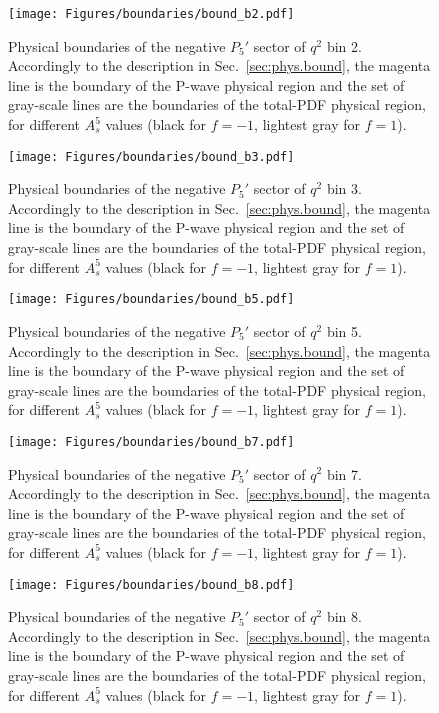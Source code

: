 \begin{figure}[!hbt]
  \centering
  \texttt{[image: Figures/boundaries/bound\_b2.pdf]}
  \caption{Physical boundaries of the negative $P_5'$ sector of $q^2$ bin 2. Accordingly to the description in Sec.~\ref{sec:phys.bound}, the magenta line is the boundary of the P-wave physical region and the set of gray-scale lines are the boundaries of the total-PDF physical region, for different $A_s^5$ values (black for $f=-1$, lightest gray for $f=1$).}
  \label{fig:bound2}
\end{figure}

\begin{figure}[!hbt]
  \centering
  \texttt{[image: Figures/boundaries/bound\_b3.pdf]}
  \caption{Physical boundaries of the negative $P_5'$ sector of $q^2$ bin 3. Accordingly to the description in Sec.~\ref{sec:phys.bound}, the magenta line is the boundary of the P-wave physical region and the set of gray-scale lines are the boundaries of the total-PDF physical region, for different $A_s^5$ values (black for $f=-1$, lightest gray for $f=1$).}
  \label{fig:bound3}
\end{figure}

\begin{figure}[!hbt]
  \centering
  \texttt{[image: Figures/boundaries/bound\_b5.pdf]}
  \caption{Physical boundaries of the negative $P_5'$ sector of $q^2$ bin 5. Accordingly to the description in Sec.~\ref{sec:phys.bound}, the magenta line is the boundary of the P-wave physical region and the set of gray-scale lines are the boundaries of the total-PDF physical region, for different $A_s^5$ values (black for $f=-1$, lightest gray for $f=1$).}
  \label{fig:bound5}
\end{figure}

\begin{figure}[!hbt]
  \centering
  \texttt{[image: Figures/boundaries/bound\_b7.pdf]}
  \caption{Physical boundaries of the negative $P_5'$ sector of $q^2$ bin 7. Accordingly to the description in Sec.~\ref{sec:phys.bound}, the magenta line is the boundary of the P-wave physical region and the set of gray-scale lines are the boundaries of the total-PDF physical region, for different $A_s^5$ values (black for $f=-1$, lightest gray for $f=1$).}
  \label{fig:bound7}
\end{figure}

\begin{figure}[!hbt]
  \centering
  \texttt{[image: Figures/boundaries/bound\_b8.pdf]}
  \caption{Physical boundaries of the negative $P_5'$ sector of $q^2$ bin 8. Accordingly to the description in Sec.~\ref{sec:phys.bound}, the magenta line is the boundary of the P-wave physical region and the set of gray-scale lines are the boundaries of the total-PDF physical region, for different $A_s^5$ values (black for $f=-1$, lightest gray for $f=1$).}
  \label{fig:bound8}
\end{figure}


